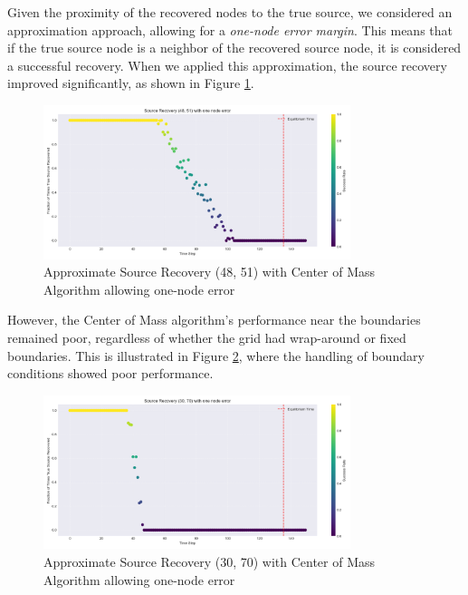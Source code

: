 Given the proximity of the recovered nodes to the true source, we considered an approximation approach, allowing for a \textit{one-node error margin}. This means that if the true source node is a neighbor of the recovered source node, it is considered a successful recovery. When we applied this approximation, the source recovery improved significantly, as shown in Figure \ref{fig:approx_source_recovery_48_51_Center_of_Mass}.

\begin{figure}[H]
    \centering
    \includegraphics[width=0.8\textwidth]{approx_source_recovery_48_51_Center_of_Mass.png}
    \caption{Approximate Source Recovery (48, 51) with Center of Mass Algorithm allowing one-node error}
    \label{fig:approx_source_recovery_48_51_Center_of_Mass}
\end{figure}

However, the Center of Mass algorithm's performance near the boundaries remained poor, regardless of whether the grid had wrap-around or fixed boundaries. This is illustrated in Figure \ref{fig:approx_source_recovery_30_70_Center_of_Mass}, where the handling of boundary conditions showed poor performance.

\begin{figure}[H]
    \centering
    \includegraphics[width=0.8\textwidth]{approx_source_recovery_30_70_Center_of_Mass.png}
    \caption{Approximate Source Recovery (30, 70) with Center of Mass Algorithm allowing one-node error}
    \label{fig:approx_source_recovery_30_70_Center_of_Mass}
\end{figure}

